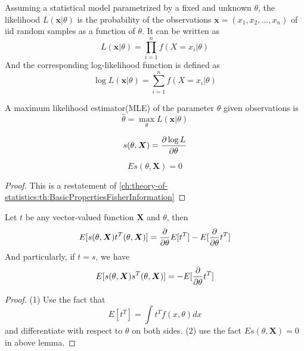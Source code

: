 \begin{refsection}
\begin{definition}
	\cite[22]{pawitan2001all}
	Assuming a statistical model parametrized by a fixed and unknown $\theta$, the likelihood $L(\bm{x}|\theta)$ is the probability of the observations $\bm{x}=(x_1,x_2,...,x_n)$ of iid random samples as a function of $\theta$. It can be written as
	$$L(\bm{x}|\theta) = \prod_{i=1}^n f(X=x_i|\theta)$$
	And the corresponding log-likelihood function is defined as
	$$\log L(\bm{x}|\theta) = \sum_{i=1}^n f(X=x_i|\theta)$$
	
\end{definition}

\begin{definition}
	\cite[316]{casella2002statistical} A maximum likelihood estimator(MLE) of the parameter $\theta$ given observations is
	$$\hat{\theta} = \max_{\theta} L(\bm{x}|\theta)$$
\end{definition}





\begin{definition}\cite[548]{moon2000mathematical}
	
	$$s(\theta,\bm{X}) = \frac{\partial \log L}{\partial \theta}$$
\end{definition}

\begin{lemma}
	$$Es(\theta,\bm{X}) = 0$$
\end{lemma}
\begin{proof}
	This is a restatement of \autoref{ch:theory-of-statistics:th:BasicPropertiesFisherInformation}
\end{proof}

\begin{lemma}\cite[550]{moon2000mathematical}
	Let $t$ be any vector-valued function $\bm{X}$ and $\theta$, then
	$$E[s(\theta,\bm{X})t^T(\theta,\bm{X})] = \frac{\partial}{\partial \theta} E[t^T] - E[\frac{\partial}{\partial \theta} t^T]$$ 
	And particularly, if $t = s$, we have
		$$E[s(\theta,\bm{X})s^T(\theta,\bm{X})] =  - E[\frac{\partial}{\partial \theta} t^T]$$ 	
\end{lemma}
\begin{proof}
(1)	Use the fact that
	$$E[t^T] = \int t^T f(x,\theta) dx$$
	and differentiate with respect to $\theta$ on both sides.
	(2) use the fact $Es(\theta,\bm{X}) = 0$ in above lemma.
\end{proof}



\end{refsection}
